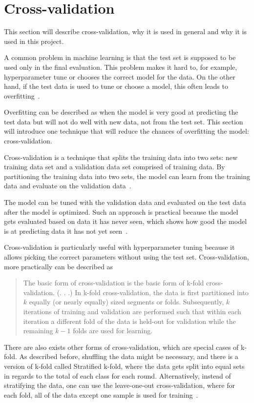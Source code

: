\section{Cross-validation}\label{sec:cross-validation}
This section will describe cross-validation, why it is used in general and why it is used in this project.

A common problem in machine learning is that the test set is supposed to be used only in the final evaluation. This problem makes it hard to, for example, hyperparameter tune or chooses the correct model for the data. On the other hand, if the test data is used to tune or choose a model, this often leads to overfitting~\cite{james-statistical-learning}.

Overfitting can be described as when the model is very good at predicting the test data but will not do well with new data, not from the test set. This section will introduce one technique that will reduce the chances of overfitting the model: cross-validation.

Cross-validation is a technique that splits the training data into two sets: new training data set and a validation data set comprised of training data. By partitioning the training data into two sets, the model can learn from the training data and evaluate on the validation data~\cite{scikit-learn-ml}.

The model can be tuned with the validation data and evaluated on the test data after the model is optimized. Such an approach is practical because the model gets evaluated based on data it has never seen, which shows how good the model is at predicting data it has not yet seen~\cite{scikit-learn-ml}.

Cross-validation is particularly useful with hyperparameter tuning because it allows picking the correct parameters without using the test set. Cross-validation, more practically can be described as

\blockcquote{Refaeilzadeh2009}{The basic form of cross-validation is the basic form of k-fold cross-validation. (. . .) In k-fold cross-validation, the data is first partitioned into $k$ equally (or nearly equally) sized segments or folds. Subsequently, $k$ iterations of training and validation are performed such that within each iteration a different fold of the data is held-out for validation while the remaining $k-1$ folds are used for learning.}

There are also exists other forms of cross-validation, which are special cases of k-fold. As described before, shuffling the data might be necessary, and there is a version of k-fold called Stratified k-fold, where the data gets split into equal sets in regards to the total of each class for each round. Alternatively, instead of stratifying the data, one can use the leave-one-out cross-validation, where for each fold, all of the data except one sample is used for training~\cite{Refaeilzadeh2009}.

